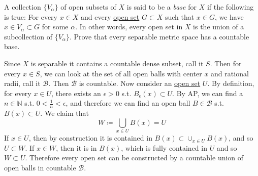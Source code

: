   \begin{exercise}[Rudin 2.23]
    A collection $\{V_\alpha\}$ of open subsets of $X$ is said to be a \textit{base} for $X$ if the following is true: For every $x \in X$ and every \hyperref[pst-def:open-set]{open set} $G \subset X$ such that $x \in G$, we have $x \in V_\alpha \subset G$ for some $\alpha$. In other words, every open set in $X$ is the union of a subcollection of $\{V_\alpha\}$. Prove that every separable metric space has a countable base. 
  \end{exercise}
  \begin{solution}
    Since $X$ is separable it contains a countable dense subset, call it $S$. Then for every $x \in S$, we can look at the set of all open balls with center $x$ and rational radii, call it $\mathcal{B}$. Then $\mathcal{B}$ is countable. Now consider an \hyperref[pst-def:open-set]{open set} $U$. By definition, for every $x \in U$, there exists an $\epsilon > 0$ s.t. $B_\epsilon (x) \subset U$. By AP, we can find a $n \in \mathbb{N}$ s.t. $0 < \frac{1}{n} < \epsilon$, and therefore we can find an open ball $B \in \mathcal{B}$ s.t. $B (x) \subset U$. We claim that 
    \begin{equation}
      W \coloneqq \bigcup_{x \in U} B (x) = U
    \end{equation}
    If $x \in U$, then by construction it is contained in $B(x) \subset \cup_{x \in U } B(x)$, and so $U \subset W$. If $x \in W$, then it is in $B(x)$, which is fully contained in $U$ and so $W \subset U$. Therefore every open set can be constructed by a countable union of open balls in countable $\mathcal{B}$. 
  \end{solution} 

